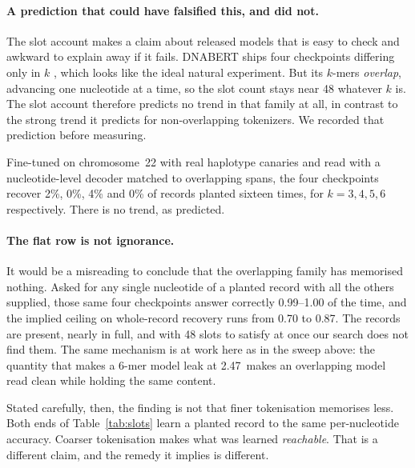 \paragraph{A prediction that could have falsified this, and did not.}
The slot account makes a claim about released models that is easy to check and awkward to explain
away if it fails. DNABERT ships four checkpoints differing only in $k$ \citep{ji2021dnabert}, which
looks like the ideal natural experiment. But its $k$-mers \emph{overlap}, advancing one nucleotide at
a time, so the slot count stays near 48 whatever $k$ is. The slot account therefore predicts no
trend in that family at all, in contrast to the strong trend it predicts for non-overlapping
tokenizers. We recorded that prediction before measuring.

Fine-tuned on chromosome~22 with real haplotype canaries and read with a nucleotide-level decoder
matched to overlapping spans, the four checkpoints recover 2\%, 0\%, 4\% and 0\% of records planted
sixteen times, for $k=3,4,5,6$ respectively. There is no trend, as predicted.

\paragraph{The flat row is not ignorance.}
It would be a misreading to conclude that the overlapping family has memorised nothing. Asked for any
single nucleotide of a planted record with all the others supplied, those same four checkpoints
answer correctly 0.99--1.00 of the time, and the implied ceiling on whole-record recovery runs from
0.70 to 0.87. The records are present, nearly in full, and with 48 slots to satisfy at once our
search does not find them. The same mechanism is at work here as in the sweep above: the quantity
that makes a 6-mer model leak at 2.47\,\bits{} makes an overlapping model read clean while holding
the same content.

Stated carefully, then, the finding is not that finer tokenisation memorises less. Both ends of
Table~\ref{tab:slots} learn a planted record to the same per-nucleotide accuracy. Coarser
tokenisation makes what was learned \emph{reachable}. That is a different claim, and the remedy it
implies is different.
